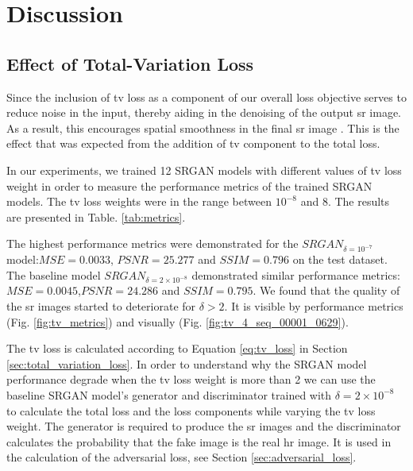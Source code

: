 \documentclass[conference]{IEEEtran}
\begin{document}
\section{Discussion}

\subsection{Effect of Total-Variation Loss}

Since the inclusion of \acrshort{tv} loss as a component of our overall loss objective serves to reduce noise in the input, thereby aiding in the denoising of the output \acrshort{sr} image. As a result, this encourages spatial smoothness in the final \acrshort{sr} image \cite{iSeeBetter_2020}. This is the effect that was expected from the addition of \acrshort{tv} component to the total loss.

In our experiments, we trained 12 SRGAN models with different values of \acrshort{tv} loss weight in order to measure the performance metrics of the trained SRGAN models. The \acrshort{tv} loss weights were in the range between $10^{-8}$ and $8$. The results are presented in Table. \ref{tab:metrics}.

The highest performance metrics were demonstrated for the $SRGAN_{\delta=10^{-7}}$ model:\newline $MSE=0.0033$, $PSNR=25.277$ and $SSIM=0.796$ on the test dataset. The baseline model $SRGAN_{\delta={2 \times 10^{-8}}}$ demonstrated similar performance metrics: $MSE=0.0045$,\newline $PSNR=24.286$ and $SSIM=0.795$. We found that the quality of the \acrshort{sr} images started to deteriorate for $\delta > 2$. It is visible by performance metrics (Fig. \ref{fig:tv_metrics}) and visually (Fig. \ref{fig:tv_4_seq_00001_0629}).

The \acrshort{tv} loss is calculated according to Equation \ref{eq:tv_loss} in Section \ref{sec:total_variation_loss}. In order to understand why the SRGAN model performance degrade when the \acrshort{tv} loss weight is more than 2 we can use the baseline SRGAN model's generator and discriminator trained with $\delta = 2 \times 10^{-8}$ to calculate the total loss and the loss components while varying the \acrshort{tv} loss weight. The generator is required to produce the \acrshort{sr} images and the discriminator calculates the probability that the fake image is the real \acrlong{hr} image. It is used in the calculation of the adversarial loss, see Section \ref{sec:adversarial_loss}.
\end{document}

